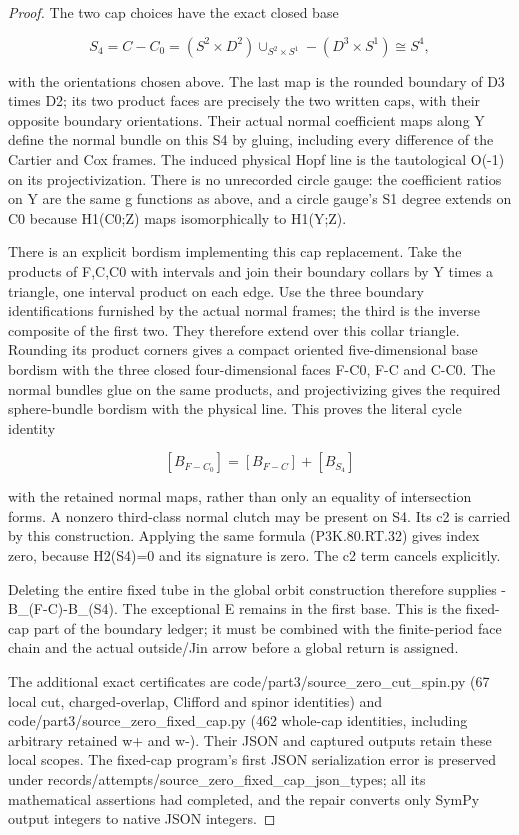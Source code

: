 \begin{proof}
The two cap choices have the exact closed base

\[
 S_4=C-C_0
     =(S^2\times D^2)\cup_{S^2\times S^1}
                        -(D^3\times S^1)\cong S^4, \tag{P3K.80.RT.33}
\]

with the orientations chosen above. The last map is the rounded
boundary of D3 times D2; its two product faces are precisely the
two written caps, with their opposite boundary orientations.
Their actual normal coefficient maps along Y define the normal
bundle on this S4 by gluing, including every difference of the
Cartier and Cox frames. The induced physical Hopf line is the
tautological O(-1) on its projectivization. There is no unrecorded
circle gauge: the coefficient ratios on Y are the same g functions
as above, and a circle gauge's S1 degree extends on C0 because
H1(C0;Z) maps isomorphically to H1(Y;Z).

There is an explicit bordism implementing this cap replacement.
Take the products of F,C,C0 with intervals and join their boundary
collars by Y times a triangle, one interval product on each edge.
Use the three boundary identifications furnished by the actual
normal frames; the third is the inverse composite of the first
two. They therefore extend over this collar triangle. Rounding
its product corners gives a compact oriented five-dimensional
base bordism with the three closed four-dimensional faces
F-C0, F-C and C-C0. The normal bundles glue on the same products,
and projectivizing gives the required sphere-bundle bordism with
the physical line. This proves the literal cycle identity

\[
 [B_{F-C_0}]=[B_{F-C}]+[B_{S_4}]                 \tag{P3K.80.RT.34}
\]

with the retained normal maps, rather than only an equality of
intersection forms. A nonzero third-class normal clutch may be
present on S4. Its c2 is carried by this construction. Applying
the same formula (P3K.80.RT.32) gives index zero, because H2(S4)=0
and its signature is zero. The c2 term cancels explicitly.

Deleting the entire fixed tube in the global orbit construction
therefore supplies -B\_(F-C)-B\_(S4). The exceptional E remains
in the first base. This is the fixed-cap part of the boundary
ledger; it must be combined with the finite-period face chain
and the actual outside/Jin arrow before a global return is assigned.

The additional exact certificates are
code/part3/source\_zero\_cut\_spin.py (67 local cut, charged-overlap,
Clifford and spinor identities) and
code/part3/source\_zero\_fixed\_cap.py (462 whole-cap identities,
including arbitrary retained w+ and w-). Their JSON and captured
outputs retain these local scopes. The fixed-cap program's first
JSON serialization error is preserved under
records/attempts/source\_zero\_fixed\_cap\_json\_types; all its
mathematical assertions had completed, and the repair converts
only SymPy output integers to native JSON integers.



\end{proof}
